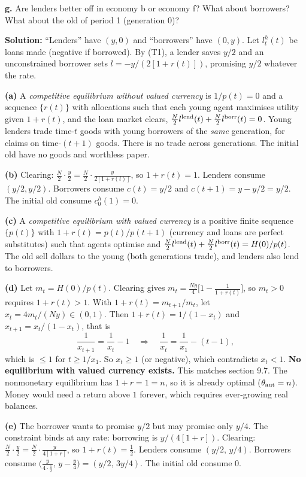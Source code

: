 \documentclass[12pt, letterpaper]{article}
\begin{document}
\begin{tcolorbox}[oddbox,title={Exercise 9.7 \quad Credit controls}]
\begin{tcolorbox}[questionbox]
\textbf{g.} Are lenders better off in economy b or economy f? What about borrowers? What about the
old of period 1 (generation 0)?
\end{tcolorbox}

\textbf{Solution:} ``Lenders'' have $(y,0)$ and ``borrowers'' have $(0,y)$. Let $l_t^h(t)$ be loans
made (negative if borrowed). By (T1), a lender saves $y/2$ and an unconstrained borrower sets
$l=-y/(2[1+r(t)])$, promising $y/2$ whatever the rate.

\textbf{(a)} A \emph{competitive equilibrium without valued currency} is $1/p(t)=0$ and a sequence
$\{r(t)\}$ with allocations such that each young agent maximises utility given $1+r(t)$, and the loan
market clears, $\frac N2l^{\rm lend}(t)+\frac N2l^{\rm borr}(t)=0$. Young lenders trade time-$t$
goods with young borrowers of the \emph{same} generation, for claims on time-$(t+1)$ goods. There is
no trade across generations. The initial old have no goods and worthless paper.

\textbf{(b)} Clearing: $\frac N2\cdot\frac y2=\frac N2\cdot\frac y{2[1+r(t)]}$, so
$\boxed{1+r(t)=1}$. Lenders consume $(y/2,y/2)$. Borrowers consume $c(t)=y/2$ and
$c(t+1)=y-y/2=y/2$. The initial old consume $c_0^h(1)=0$.

\textbf{(c)} A \emph{competitive equilibrium with valued currency} is a positive finite sequence
$\{p(t)\}$ with $1+r(t)=p(t)/p(t+1)$ (currency and loans are perfect substitutes) such that agents
optimise and $\frac N2l^{\rm lend}(t)+\frac N2l^{\rm borr}(t)=H(0)/p(t)$. The old sell dollars to the
young (both generations trade), and lenders also lend to borrowers.

\textbf{(d)} Let $m_t=H(0)/p(t)$. Clearing gives $m_t=\frac{Ny}4\big[1-\frac1{1+r(t)}\big]$, so
$m_t>0$ requires $1+r(t)>1$. With $1+r(t)=m_{t+1}/m_t$, let $x_t=4m_t/(Ny)\in(0,1)$. Then
$1+r(t)=1/(1-x_t)$ and $x_{t+1}=x_t/(1-x_t)$, that is
\[
\frac1{x_{t+1}}=\frac1{x_t}-1\quad\Longrightarrow\quad \frac1{x_t}=\frac1{x_1}-(t-1),
\]
which is $\le1$ for $t\ge1/x_1$. So $x_t\ge1$ (or negative), which contradicts $x_t<1$. \textbf{No
equilibrium with valued currency exists.} This matches section 9.7. The nonmonetary equilibrium has
$1+r=1=n$, so it is already optimal ($\theta_{\rm aut}=n$). Money would need a return above $1$
forever, which requires ever-growing real balances.

\textbf{(e)} The borrower wants to promise $y/2$ but may promise only $y/4$. The constraint binds at
any rate: borrowing is $y/(4[1+r])$. Clearing: $\frac N2\cdot\frac y2=\frac N2\cdot\frac y{4[1+r]}$, so
$\boxed{1+r(t)=\tfrac12}$. Lenders consume $(y/2,\,y/4)$. Borrowers consume
$\big(\frac y{4\cdot\frac12},\,y-\frac y4\big)=(y/2,\,3y/4)$. The initial old consume $0$.


\end{tcolorbox}
\end{document}
